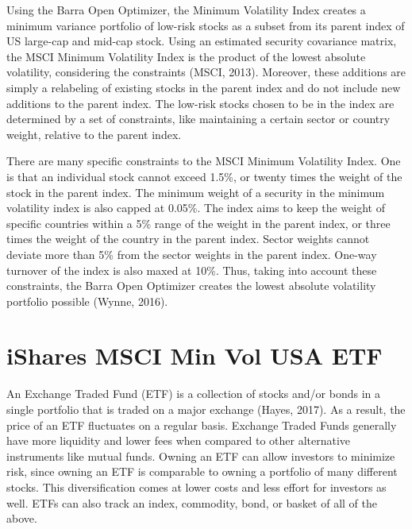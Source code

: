 \documentclass[12pt,twoside]{reedthesis}
\theoremstyle{definition}
\theoremstyle{definition}
\theoremstyle{definition}
\theoremstyle{remark}
\begin{document}
Using the Barra Open Optimizer, the Minimum Volatility Index creates a
minimum variance portfolio of low-risk stocks as a subset from its
parent index of US large-cap and mid-cap stock. Using an estimated
security covariance matrix, the MSCI Minimum Volatility Index is the
product of the lowest absolute volatility, considering the constraints
(MSCI, 2013). Moreover, these additions are simply a relabeling of
existing stocks in the parent index and do not include new additions to
the parent index. The low-risk stocks chosen to be in the index are
determined by a set of constraints, like maintaining a certain sector or
country weight, relative to the parent index.

There are many specific constraints to the MSCI Minimum Volatility
Index. One is that an individual stock cannot exceed 1.5\%, or twenty
times the weight of the stock in the parent index. The minimum weight of
a security in the minimum volatility index is also capped at 0.05\%. The
index aims to keep the weight of specific countries within a 5\% range
of the weight in the parent index, or three times the weight of the
country in the parent index. Sector weights cannot deviate more than 5\%
from the sector weights in the parent index. One-way turnover of the
index is also maxed at 10\%. Thus, taking into account these
constraints, the Barra Open Optimizer creates the lowest absolute
volatility portfolio possible (Wynne, 2016).

\section{iShares MSCI Min Vol USA
ETF}\label{ishares-msci-min-vol-usa-etf}

An Exchange Traded Fund (ETF) is a collection of stocks and/or bonds in
a single portfolio that is traded on a major exchange (Hayes, 2017). As
a result, the price of an ETF fluctuates on a regular basis. Exchange
Traded Funds generally have more liquidity and lower fees when compared
to other alternative instruments like mutual funds. Owning an ETF can
allow investors to minimize risk, since owning an ETF is comparable to
owning a portfolio of many different stocks. This diversification comes
at lower costs and less effort for investors as well. ETFs can also
track an index, commodity, bond, or basket of all of the above.
\end{document}
